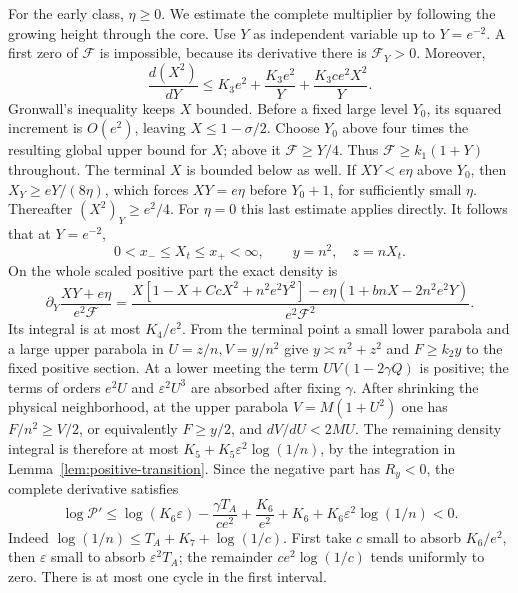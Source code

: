 For the early class, $\eta\ge0$. We estimate the complete multiplier
by following the growing height through the core. Use $Y$ as independent
variable up to $Y=e^{-2}$. A first zero of $\mathcal F$ is impossible, because
its derivative there is $\mathcal F_Y>0$.
Moreover,
\begin{equation}\label{eq:simple-growing-height}
 \frac{d(X^2)}{dY}\le K_3e^2+\frac{K_3e^2}{Y}
                         +\frac{K_3ce^2X^2}{Y}.
\end{equation}
Gronwall's inequality keeps $X$ bounded.  Before a fixed large level
$Y_0$, its squared increment is $O(e^2)$, leaving
$X\le1-\sigma/2$.  Choose $Y_0$ above four times the resulting
global upper bound for $X$; above it $\mathcal F\ge Y/4$.
Thus $\mathcal F\ge k_1(1+Y)$ throughout.
The terminal $X$ is bounded below as well.  If $XY<e\eta$ above
$Y_0$, then $X_Y\ge eY/(8\eta)$, which forces $XY=e\eta$ before
$Y_0+1$, for sufficiently small $\eta$.  Thereafter
$(X^2)_Y\ge e^2/4$.  For $\eta=0$ this last estimate applies directly.
It follows that at $Y=e^{-2}$,
\[
 0<x_-\le X_t\le x_+<\infty,\qquad y=n^2,\quad z=nX_t.
\]
On the whole scaled positive part the exact density is
\[
 \partial_Y\frac{XY+e\eta}{e^2\mathcal F}
 =\frac{X[1-X+CcX^2+n^2e^2Y^2]
                 -e\eta(1+bnX-2n^2e^2Y)}
        {e^2\mathcal F^2}.
\]
Its integral is at most $K_4/e^2$.
From the terminal point a small lower parabola and a large upper
parabola in $U=z/n,V=y/n^2$ give
$y\asymp n^2+z^2$ and $F\ge k_2y$ to the fixed positive section.
At a lower meeting the term $UV(1-2\gamma Q)$ is positive; the terms
of orders $e^2U$ and $\varepsilon^2U^3$ are absorbed after fixing
$\gamma$. After shrinking the physical neighborhood, at the upper
parabola $V=M(1+U^2)$ one has $F/n^2\ge V/2$, or equivalently
$F\ge y/2$, and $dV/dU<2MU$.
The remaining density integral is therefore at most
$K_5+K_5\varepsilon^2\log(1/n)$, by the integration in
Lemma~\ref{lem:positive-transition}.
Since the negative part has $R_y<0$, the complete derivative satisfies
\begin{equation}\label{eq:simple-first-class-multiplier}
 \log\mathcal P'\le
 \log(K_6\varepsilon)-\frac{\gamma T_A}{ce^2}
                 +\frac{K_6}{e^2}+K_6
                 +K_6\varepsilon^2\log(1/n)<0.
\end{equation}
Indeed $\log(1/n)\le T_A+K_7+\log(1/c)$.
First take $c$ small to absorb $K_6/e^2$, then $\varepsilon$ small
to absorb $\varepsilon^2T_A$; the remainder
$ce^2\log(1/c)$ tends uniformly to zero.
There is at most one cycle in the first interval.

